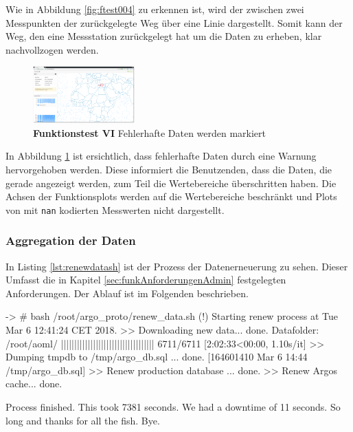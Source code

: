 Wie in Abbildung \ref{fig:ftest004} zu erkennen ist, wird der zwischen zwei Messpunkten der zurückgelegte Weg über eine Linie dargestellt. Somit kann der Weg, den eine Messstation zurückgelegt hat um die Daten zu erheben, klar nachvollzogen werden.
\newline\newline\newline\newline
\newline\newline\newline


\begin{figure}
 \centering
 \includegraphics[width=0.35\textwidth]{pix/ftest/00fail.png}

 \caption{\textbf{Funktionstest VI} Fehlerhafte Daten werden markiert}
 \label{fig:ftest00fail}
\end{figure}

In Abbildung \ref{fig:ftest00fail} ist ersichtlich, dass fehlerhafte Daten durch eine Warnung hervorgehoben werden. Diese informiert die Benutzenden, dass die Daten, die gerade angezeigt werden, zum Teil die Wertebereiche überschritten haben. Die Achsen der Funktionsplots werden auf die Wertebereiche beschränkt und Plots von mit \texttt{nan} kodierten Messwerten nicht dargestellt.
\newline
\newline



\subsubsection{Aggregation der Daten}

In Listing \ref{lst:renewdatash} ist der Prozess der Datenerneuerung zu sehen. Dieser Umfasst die in Kapitel \ref{sec:funkAnforderungenAdmin} festgelegten Anforderungen. Der Ablauf ist im Folgenden beschrieben.

\begin{python}[%
        label={lst:renewdatash},%
        caption={Erneuerung des Datensatzes}]
 -> # bash /root/argo_proto/renew_data.sh
(!) Starting renew process at Tue Mar  6 12:41:24 CET 2018.
 >> Downloading new data...
        done.
Datafolder: /root/aoml/
||||||||||||||||||||||||||||||||||| 6711/6711 [2:02:33<00:00,  1.10s/it]
 >> Dumping tmpdb to /tmp/argo_db.sql ...
        done. [164601410 Mar  6 14:44 /tmp/argo_db.sql]
 >> Renew production database ...
        done.
 >> Renew Argos cache...
        done.

Process finished.
This took  7381 seconds.
We had a downtime of 11 seconds.
So long and thanks for all the fish. Bye.
\end{python}

